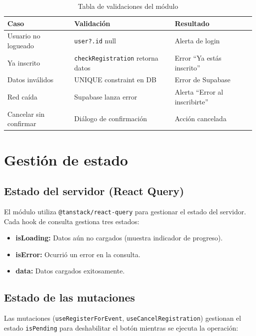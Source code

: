 \documentclass[12pt,letterpaper]{article}
\begin{document}
\begin{table}[H]
\centering
\begin{tabular}{@{}lp{4cm}p{4cm}@{}}
\toprule
\textbf{Caso} & \textbf{Validaci\'on} & \textbf{Resultado} \\
\midrule
Usuario no logueado & \texttt{user?.id} null & Alerta de login \\
Ya inscrito & \texttt{checkRegistration} retorna datos & Error
  ``Ya est\'as inscrito'' \\
Datos inv\'alidos & UNIQUE constraint en DB & Error de Supabase \\
Red ca\'ida & Supabase lanza error & Alerta ``Error al
  inscribirte'' \\
Cancelar sin confirmar & Di\'alogo de confirmaci\'on & Acci\'on
  cancelada \\
\bottomrule
\end{tabular}
\caption{Tabla de validaciones del m\'odulo}
\end{table}

\section{Gesti\'on de estado}

\subsection{Estado del servidor (React Query)}

El m\'odulo utiliza \texttt{@tanstack/react-query} para gestionar
el estado del servidor. Cada hook de consulta gestiona tres estados:

\begin{itemize}
  \item \textbf{isLoading:} Datos a\'un no cargados (muestra
    indicador de progreso).
  \item \textbf{isError:} Ocurri\'o un error en la consulta.
  \item \textbf{data:} Datos cargados exitosamente.
\end{itemize}

\subsection{Estado de las mutaciones}

Las mutaciones (\texttt{useRegisterForEvent}, \texttt{useCancelRegistration})
gestionan el estado \texttt{isPending} para deshabilitar el bot\'on
mientras se ejecuta la operaci\'on:
\end{document}
